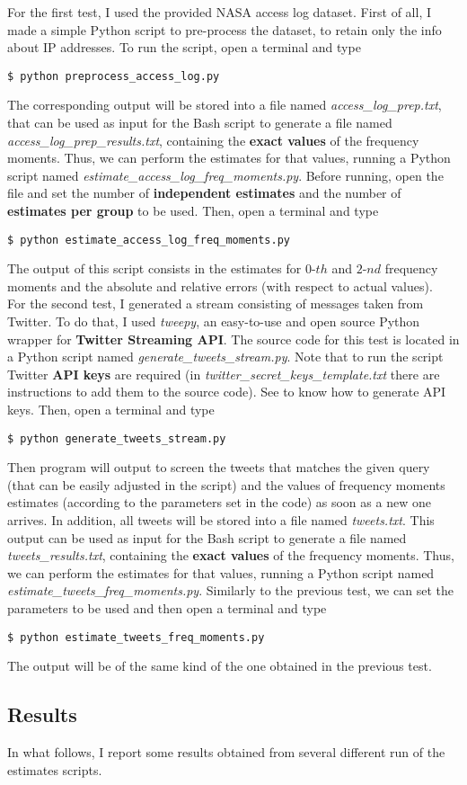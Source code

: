 \noindent For the first test, I used the provided NASA access log dataset\cite{nasa}. First of all, I made a simple Python script to pre-process the dataset, to retain only the info about IP addresses. To run the script, open a terminal and type
\begin{lstlisting}
$ python preprocess_access_log.py
\end{lstlisting}
The corresponding output will be stored into a file named \textit{access\_log\_prep.txt}, that can be used as input for the Bash script to generate a file named \textit{access\_log\_prep\_results.txt}, containing the \textbf{exact values} of the frequency moments.
Thus, we can perform the estimates for that values, running a Python script named \textit{estimate\_access\_log\_freq\_moments.py}. Before running, open the file and set the number of \textbf{independent estimates} and the number of \textbf{estimates per group} to be used. Then, open a terminal and type
\begin{lstlisting}
$ python estimate_access_log_freq_moments.py
\end{lstlisting}
The output of this script consists in the estimates for $0\text{-}th$ and $2\text{-}nd$ frequency moments and the absolute and relative errors (with respect to actual values).\\

\noindent For the second test, I generated a stream consisting of messages taken from Twitter. To do that, I used \textit{tweepy}\cite{tweepy}, an easy-to-use and open source Python wrapper for \textbf{Twitter Streaming API}\cite{twitter}. The source code for this test is located in a Python script named \textit{generate\_tweets\_stream.py}. Note that to run the script Twitter \textbf{API keys} are required (in \textit{twitter\_secret\_keys\_template.txt} there are instructions to add them to the source code). See \cite{twitter} to know how to generate API keys. Then, open a terminal and type
\begin{lstlisting}
$ python generate_tweets_stream.py
\end{lstlisting}
Then program will output to screen the tweets that matches the given query (that can be easily adjusted in the script) and the values of frequency moments estimates (according to the parameters set in the code) as soon as a new one arrives.
In addition, all tweets will be stored into a file named \textit{tweets.txt}. This output can be used as input for the Bash script to generate a file named \textit{tweets\_results.txt}, containing the \textbf{exact values} of the frequency moments.
Thus, we can perform the estimates for that values, running a Python script named \textit{estimate\_tweets\_freq\_moments.py}. Similarly to the previous test, we can set the parameters to be used and then open a terminal and type
\begin{lstlisting}
$ python estimate_tweets_freq_moments.py
\end{lstlisting}
The output will be of the same kind of the one obtained in the previous test.


\subsection{Results}

In what follows, I report some results obtained from several different run of the estimates scripts.



